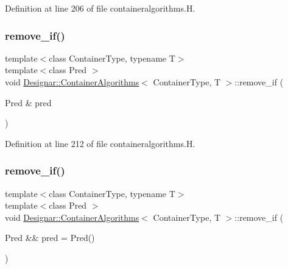 Definition at line 206 of file containeralgorithms.\+H.

\mbox{\label{class_designar_1_1_container_algorithms_a9f62149769fa7797947d019692306e09}} 
\subsubsection{\texorpdfstring{remove\+\_\+if()}{remove\_if()}\hspace{0.1cm}{\footnotesize\ttfamily [1/2]}}
{\footnotesize\ttfamily template$<$class Container\+Type, typename T$>$ \\
template$<$class Pred $>$ \\
void \hyperlink{class_designar_1_1_container_algorithms}{Designar\+::\+Container\+Algorithms}$<$ Container\+Type, T $>$\+::remove\+\_\+if (\begin{DoxyParamCaption}\item[{Pred \&}]{pred }\end{DoxyParamCaption})\hspace{0.3cm}{\ttfamily [inline]}}



Definition at line 212 of file containeralgorithms.\+H.

\mbox{\label{class_designar_1_1_container_algorithms_ae619268160dffda758b816a0db9bd8a0}} 
\subsubsection{\texorpdfstring{remove\+\_\+if()}{remove\_if()}\hspace{0.1cm}{\footnotesize\ttfamily [2/2]}}
{\footnotesize\ttfamily template$<$class Container\+Type, typename T$>$ \\
template$<$class Pred $>$ \\
void \hyperlink{class_designar_1_1_container_algorithms}{Designar\+::\+Container\+Algorithms}$<$ Container\+Type, T $>$\+::remove\+\_\+if (\begin{DoxyParamCaption}\item[{Pred \&\&}]{pred = {\ttfamily Pred()} }\end{DoxyParamCaption})\hspace{0.3cm}{\ttfamily [inline]}}



